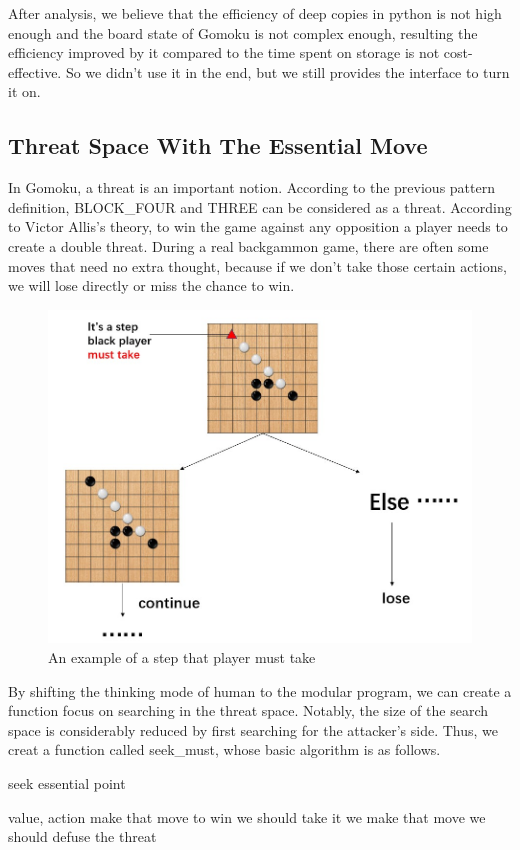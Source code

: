 \documentclass[a4paper, 12pt]{article} %
\begin{document}
\begin{multicols}{2}
	After analysis, we believe that the efficiency of deep copies in python is not high enough and the board state of Gomoku is not complex enough, resulting the efficiency improved by it compared to the time spent on storage is not cost-effective. So we didn't use it in the end, but we still provides the interface to turn it on.


    \subsection{Threat Space With The Essential Move}
    In Gomoku, a threat is an important notion. According to the previous pattern definition, BLOCK\_FOUR and THREE can be considered as a threat. According to Victor Allis's theory, to win the game against any opposition a player needs to create a double threat. During a real backgammon game, there are often some moves that need no extra thought, because if we don't take those certain actions, we will lose directly or miss the chance to win.
    \begin{figure}[H]
    \centering
    \includegraphics[scale=0.45]{figure2.jpg}
    \caption{An example of a step that player must take}
    \label{figure}
    \end{figure}
    By shifting the thinking mode of human to the modular program, we can create a function focus on searching in the threat space. Notably, the size of the search space is considerably reduced by first searching for the attacker's side. Thus, we creat a function called seek\_must, whose basic algorithm is as follows.
    \begin{algorithm}[H]
		\caption{seek essential point}
		\begin{algorithmic}[2]
			\Ensure value, action
        \State make that move to win
      \Else
          \State we should take it
        \Else
            \State we make that move
          \Else
              \State we should defuse the threat
            \EndIf
          \EndIf
        \EndIf
      \EndIf
    \end{algorithmic}
	  \end{algorithm}


\end{multicols}
\end{document}
